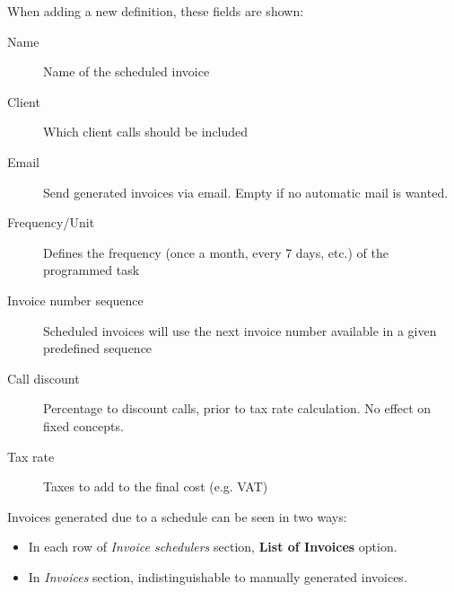 \documentclass[letterpaper,10pt,spanish]{sphinxmanual}
\begin{document}
When adding a new definition, these fields are shown:
\begin{description}
\item[{Name}] \leavevmode{}\label{administration_portal/brand/invoicing/invoice_schedulers:term-name}
Name of the scheduled invoice

\item[{Client}] \leavevmode{}\label{administration_portal/brand/invoicing/invoice_schedulers:term-client}
Which client calls should be included

\item[{Email}] \leavevmode{}\label{administration_portal/brand/invoicing/invoice_schedulers:term-email}
Send generated invoices via email. Empty if no automatic mail is wanted.

\item[{Frequency/Unit}] \leavevmode{}\label{administration_portal/brand/invoicing/invoice_schedulers:term-frequency-unit}
Defines the frequency (once a month, every 7 days, etc.) of the programmed task

\item[{Invoice number sequence}] \leavevmode{}\label{administration_portal/brand/invoicing/invoice_schedulers:term-invoice-number-sequence}
Scheduled invoices will use the next invoice number available in a given predefined sequence

\item[{Call discount}] \leavevmode{}\label{administration_portal/brand/invoicing/invoice_schedulers:term-call-discount}
Percentage to discount calls, prior to tax rate calculation. No effect on fixed concepts.

\item[{Tax rate}] \leavevmode{}\label{administration_portal/brand/invoicing/invoice_schedulers:term-tax-rate}
Taxes to add to the final cost (e.g. VAT)

\end{description}

Invoices generated due to a schedule can be seen in two ways:
\begin{itemize}
\item {} 
In each row of \emph{Invoice schedulers} section, \textbf{List of Invoices} option.

\item {} 
In \emph{Invoices} section, indistinguishable to manually generated invoices.

\end{itemize}
\end{document}
